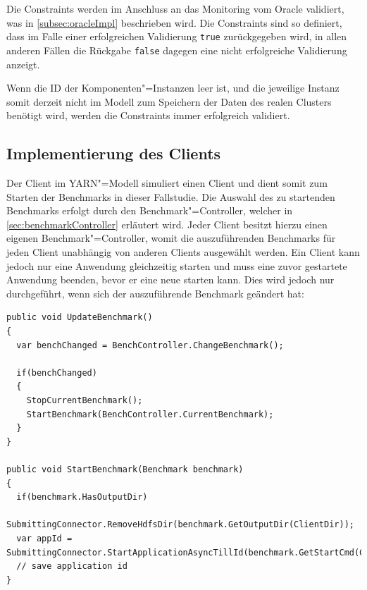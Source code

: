 Die Constraints werden im Anschluss an das Monitoring vom Oracle validiert, was in \cref{subsec:oracleImpl} beschrieben wird.
Die Constraints sind so definiert, dass im Falle einer erfolgreichen Validierung \texttt{true} zurückgegeben wird, in allen anderen Fällen die Rückgabe \texttt{false} dagegen eine nicht erfolgreiche Validierung anzeigt.

Wenn die ID der Komponenten"=Instanzen leer ist, und die jeweilige Instanz somit derzeit nicht im Modell zum Speichern der Daten des realen Clusters benötigt wird, werden die Constraints immer erfolgreich validiert.

\subsection{Implementierung des Clients}
\label{subsec:yarnClient}

Der Client im \gls{YARN}"=Modell simuliert einen Client und dient somit zum Starten der Benchmarks in dieser Fallstudie.
Die Auswahl des zu startenden Benchmarks erfolgt durch den Benchmark"=Controller, welcher in \cref{sec:benchmarkController} erläutert wird.
Jeder Client besitzt hierzu einen eigenen Benchmark"=Controller, womit die auszuführenden Benchmarks für jeden Client unabhängig von anderen Clients ausgewählt werden.
Ein Client kann jedoch nur eine \gls{Anwendung} gleichzeitig starten und muss eine zuvor gestartete \gls{Anwendung} beenden, bevor er eine neue starten kann.
Dies wird jedoch nur durchgeführt, wenn sich der auszuführende Benchmark geändert hat:

\begin{lstlisting}[label=lst:startClientBenchmark,style=cs,
caption={[Auswahl und Start des nachfolgenden Benchmarks]
    Auswahl und Start des nachfolgenden Benchmarks (gekürzt).
    Die Methode \texttt{ChangeBenchmark()} des Benchmark"=Controllers wird in \cref{subsec:selectionNextBenchmark} erläutert.}]
public void UpdateBenchmark()
{
  var benchChanged = BenchController.ChangeBenchmark();
  
  if(benchChanged)
  {
    StopCurrentBenchmark();
    StartBenchmark(BenchController.CurrentBenchmark);
  }
}

public void StartBenchmark(Benchmark benchmark)
{
  if(benchmark.HasOutputDir)
    SubmittingConnector.RemoveHdfsDir(benchmark.GetOutputDir(ClientDir));
  var appId = SubmittingConnector.StartApplicationAsyncTillId(benchmark.GetStartCmd(ClientDir));
  // save application id
}
\end{lstlisting}

